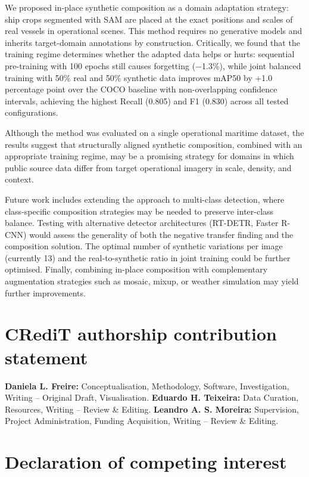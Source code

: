\documentclass[a4paper,fleqn]{cas-dc}
\begin{document}
We proposed in-place synthetic composition as a domain adaptation strategy: ship crops segmented with SAM are placed at the exact positions and scales of real vessels in operational scenes. This method requires no generative models and inherits target-domain annotations by construction. Critically, we found that the training regime determines whether the adapted data helps or hurts: sequential pre-training with 100 epochs still causes forgetting ($-$1.3\%), while joint balanced training with 50\% real and 50\% synthetic data improves mAP50 by +1.0 percentage point over the COCO baseline with non-overlapping confidence intervals, achieving the highest Recall (0.805) and F1 (0.830) across all tested configurations.

Although the method was evaluated on a single operational maritime dataset, the results suggest that structurally aligned synthetic composition, combined with an appropriate training regime, may be a promising strategy for domains in which public source data differ from target operational imagery in scale, density, and context.

Future work includes extending the approach to multi-class detection, where class-specific composition strategies may be needed to preserve inter-class balance. Testing with alternative detector architectures (RT-DETR, Faster R-CNN) would assess the generality of both the negative transfer finding and the composition solution. The optimal number of synthetic variations per image (currently 13) and the real-to-synthetic ratio in joint training could be further optimised. Finally, combining in-place composition with complementary augmentation strategies such as mosaic, mixup, or weather simulation may yield further improvements.

\section*{CRediT authorship contribution statement}

\textbf{Daniela L. Freire:} Conceptualisation, Methodology, Software, Investigation, Writing -- Original Draft, Visualisation.
\textbf{Eduardo H. Teixeira:} Data Curation, Resources, Writing -- Review \& Editing.
\textbf{Leandro A. S. Moreira:} Supervision, Project Administration, Funding Acquisition, Writing -- Review \& Editing.

\section*{Declaration of competing interest}
\end{document}
